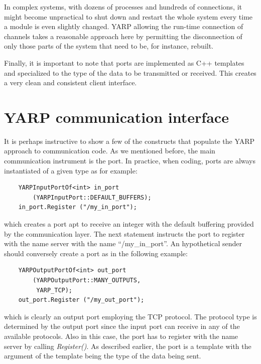 In complex systems, with dozens of processes and hundreds of connections, it might become
unpractical to shut down and restart the whole system every time a module is even slightly 
changed. YARP allowing the run-time connection of channels takes a reasonable approach
here by permitting the disconnection of only those parts of the system that need to be, 
for instance, rebuilt.

Finally, it is important to note that ports are implemented as C++ templates and 
specialized to the type of the data to be transmitted or received. This creates a very 
clean and consistent client interface.

\section{YARP communication interface}
It is perhaps instructive to show a few of the constructs that populate the YARP approach
to communication code. As we mentioned before, the main communication instrument is the 
port. In practice, when coding, ports are always instantiated of a given type as for 
example:
%
\begin{verbatim}
    YARPInputPortOf<int> in_port
        (YARPInputPort::DEFAULT_BUFFERS);
    in_port.Register ("/my_in_port");
\end{verbatim}
%
\noindent which creates a port apt to receive an integer with the default buffering
provided by the communication layer. The next statement 
instructs the port to register with the name server with the name ``/my\_in\_port''. An 
hypothetical sender should conversely create a port as in the following example:
%
\begin{verbatim}
    YARPOutputPortOf<int> out_port
        (YARPOutputPort::MANY_OUTPUTS, 
         YARP_TCP);
    out_port.Register ("/my_out_port");
\end{verbatim}
%
\noindent which is clearly an output port employing the TCP protocol. The protocol type
is determined by the output port since the input port can receive in any of the available
protocols. Also in this case, the port has to register with the name server by calling 
{\em Register()}. As described earlier, the port is a template with the argument of the
template being the type of the data being sent.

